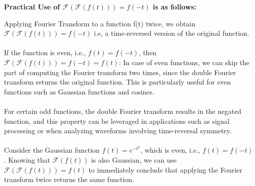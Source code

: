 \documentclass{article}
\begin{document}
\begin{enumerate}
\newpage

\textbf{Practical Use of $\mathcal{F}(\mathcal{F}(f(t))) = f(-t)$ is as follows:}

Applying Fourier Transform to a function f(t) twice, we obtain $\mathcal{F}(\mathcal{F}(f(t))) = f(-t)$ i.e, a time-reversed version of the original function.
\\\\
If the function is even, i.e., $f(t) = f(-t)$, then $\mathcal{F}(\mathcal{F}(f(t))) = f(-t) = f(t)$:
In case of even functions, we can skip the part of computing the Fourier transform two times, since the double Fourier transform returns the original function. This is particularly useful for even functions such as Gaussian functions and cosines.
\\\\
For certain odd functions, the double Fourier transform results in the negated function, and this property can be leveraged in applications such as signal processing or when analyzing waveforms involving time-reversal symmetry.
\\\\
Consider the Gaussian function $f(t) = e^{-t^2}$, which is even, i.e., $f(t) = f(-t)$. Knowing that $\mathcal{F}(f(t))$ is also Gaussian, we can use $\mathcal{F}(\mathcal{F}(f(t))) = f(t)$ to immediately conclude that applying the Fourier transform twice returns the same function.


\end{enumerate}
\end{document}
